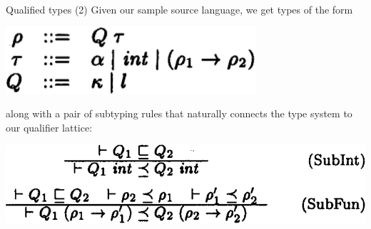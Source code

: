 \documentclass{beamer}
\begin{document}
\begin{frame}{Qualified types (2)}
  Given our sample source language, we get types of the form
  \begin{center}\includegraphics[scale=0.38]{paper_qualifiedtypegrammar.png}\end{center}
  along with a pair of subtyping rules that naturally connects the type system to our qualifier lattice:
  \begin{center}\includegraphics[scale=0.30]{paper_samplelang_subtypingrules.png}\end{center}
\end{frame}
\end{document}

